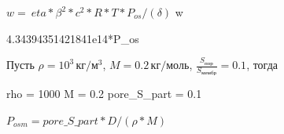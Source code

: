 \documentclass[11pt]{article}
\begin{document}
$w =\ eta * \beta^2 * c^2 * R*T * P_{os}/(\delta)$
w


4.34394351421841e14*P\_os
        
    Пусть \(\rho=10^3\,кг/м^3\), \(M = 0.2 \, кг/моль\),
\(\frac{S_{пор}}{S_{мембр}} = 0.1\), тогда

rho = 1000
M = 0.2
pore\_S\_part = 0.1


$P_{osm} = pore\_S\_part * D / (\rho * M)$

\end{document}
